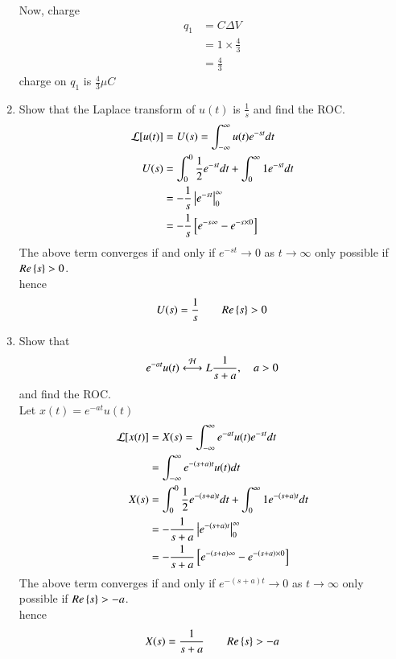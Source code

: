 \documentclass[journal,12pt,twocolumn]{IEEEtran}
\renewcommand\thesection{\arabic{section}}
\begin{document}
\begin{enumerate}[label=\arabic*.,ref=\thesection.\theenumi]
 Now, charge 
 \begin{align}
    q_1 &= C\Delta V\\
    &= 1 \times \frac{4}{3}\\
    &=\frac{4}{3}
 \end{align}
 charge on $q_1$ is $\frac{4}{3} \mu C$
	\item Show that the Laplace transform of $u(t)$ is $\frac{1}{s}$ and find the ROC.\\
	\solution \begin{align}
        \mathcal{L}[u(t)] &= U(s) =\int_{-\infty}^{\infty} u(t) e^{-st}dt\\
        U(s) &= \int_{0}^0 \frac{1}{2}e^{-st}dt + \int_0^{\infty} 1e^{-st} dt\\
        &= -\frac{1}{s}\left\vert e^{-st}\right\vert_0^{\infty}\\
        &= -\frac{1}{s} {}\left[e^{-s\infty}-e^{-s\times 0}\right]
    \end{align}
    The above term converges if and only if $e^{-st} \rightarrow 0$ as $ t \rightarrow \infty$ only possible if $Re\left\{s\right\}>0$.\\
    hence 
    \begin{equation}
        U(s) = \frac{1}{s} \qquad Re\left\{s\right\}>0
    \end{equation}
	\item Show that 
		\begin{align}
			e^{-at}u(t) \overset{\mathcal{H}}{ \longleftrightarrow}{L} \frac{1}{s+a}, \quad a > 0
		\end{align}
		and find the ROC.\\
        \solution
        Let $x(t) = e^{-at}u(t)$
        \begin{align}
            \mathcal{L}[x(t)] &= X(s) =\int_{-\infty}^{\infty}e^{-at} u(t) e^{-st}dt\\
            &=\int_{-\infty}^{\infty}e^{-(s+a)t} u(t)dt\\
            X(s) &= \int_{0}^0 \frac{1}{2}e^{-(s+a)t}dt + \int_0^{\infty} 1 e^{-(s+a)t}dt\\
            &= -\frac{1}{s+a}\left\vert e^{-(s+a)t}\right\vert_0^{\infty}\\
            &= -\frac{1}{s+a} {}\left[e^{-(s+a)\infty}-e^{-(s+a)\times 0}\right]
        \end{align}
        The above term converges if and only if $e^{-(s+a)t} \rightarrow 0$ as $ t \rightarrow \infty$ only possible if $Re\left\{s\right\}>-a$.\\
        hence 
        \begin{equation}
            X(s) = \frac{1}{s+a} \qquad Re\cbrak{s}>-a

\end{equation}
\end{enumerate}
\end{document}
